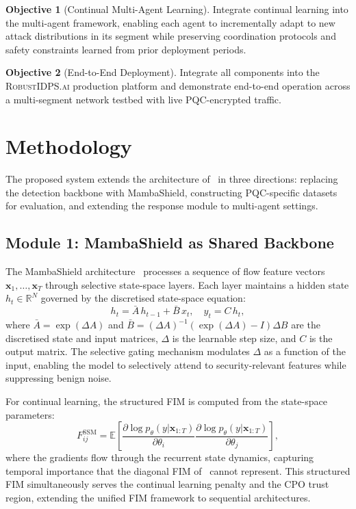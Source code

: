 \documentclass[12pt,a4paper]{article}
\newcommand{\RobustIDPS}{\textsc{RobustIDPS.ai}}
\theoremstyle{definition}
\newtheorem{objective}{Objective}[section]
\begin{document}
\begin{objective}[Continual Multi-Agent Learning]
\label{obj:cl_marl}
Integrate continual learning into the multi-agent framework, enabling each agent to incrementally adapt to new attack distributions in its segment while preserving coordination protocols and safety constraints learned from prior deployment periods.
\end{objective}

\begin{objective}[End-to-End Deployment]
\label{obj:deploy}
Integrate all components into the \RobustIDPS{} production platform and demonstrate end-to-end operation across a multi-segment network testbed with live PQC-encrypted traffic.
\end{objective}

\section{Methodology}
\label{sec:method}

The proposed system extends the architecture of~\cite{anaedevha2026cl_rl} in three directions: replacing the detection backbone with MambaShield, constructing PQC-specific datasets for evaluation, and extending the response module to multi-agent settings.

\subsection{Module 1: MambaShield as Shared Backbone}

The MambaShield architecture~\cite{anaedevha2026mambashield} processes a sequence of flow feature vectors $\mathbf{x}_1, \ldots, \mathbf{x}_T$ through selective state-space layers. Each layer maintains a hidden state $h_t \in \mathbb{R}^N$ governed by the discretised state-space equation:
\begin{equation}
h_t = \bar{A}\, h_{t-1} + \bar{B}\, x_t, \quad y_t = C\, h_t,
\end{equation}
where $\bar{A} = \exp(\Delta A)$ and $\bar{B} = (\Delta A)^{-1}(\exp(\Delta A) - I)\Delta B$ are the discretised state and input matrices, $\Delta$ is the learnable step size, and $C$ is the output matrix. The selective gating mechanism modulates $\Delta$ as a function of the input, enabling the model to selectively attend to security-relevant features while suppressing benign noise.

For continual learning, the structured FIM is computed from the state-space parameters:
\begin{equation}
F_{ij}^{\mathrm{SSM}} = \mathbb{E}\left[\frac{\partial \log p_\theta(y|\mathbf{x}_{1:T})}{\partial \theta_i} \frac{\partial \log p_\theta(y|\mathbf{x}_{1:T})}{\partial \theta_j}\right],
\end{equation}
where the gradients flow through the recurrent state dynamics, capturing temporal importance that the diagonal FIM of~\cite{anaedevha2026cl_rl} cannot represent. This structured FIM simultaneously serves the continual learning penalty and the CPO trust region, extending the unified FIM framework to sequential architectures.
\end{document}
